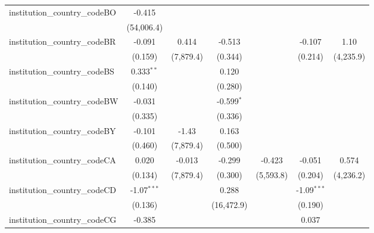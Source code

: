 \begin{tabular}{lcccccc}
   institution\_country\_codeBO          & -0.415         &               &                &               &                &   \\   
                                         & (54,006.4)     &               &                &               &                &   \\   
   institution\_country\_codeBR          & -0.091         & 0.414         & -0.513         &               & -0.107         & 1.10\\   
                                         & (0.159)        & (7,879.4)     & (0.344)        &               & (0.214)        & (4,235.9)\\   
   institution\_country\_codeBS          & 0.333$^{**}$   &               & 0.120          &               &                &   \\   
                                         & (0.140)        &               & (0.280)        &               &                &   \\   
   institution\_country\_codeBW          & -0.031         &               & -0.599$^{*}$   &               &                &   \\   
                                         & (0.335)        &               & (0.336)        &               &                &   \\   
   institution\_country\_codeBY          & -0.101         & -1.43         & 0.163          &               &                &   \\   
                                         & (0.460)        & (7,879.4)     & (0.500)        &               &                &   \\   
   institution\_country\_codeCA          & 0.020          & -0.013        & -0.299         & -0.423        & -0.051         & 0.574\\   
                                         & (0.134)        & (7,879.4)     & (0.300)        & (5,593.8)     & (0.204)        & (4,236.2)\\   
   institution\_country\_codeCD          & -1.07$^{***}$  &               & 0.288          &               & -1.09$^{***}$  &   \\   
                                         & (0.136)        &               & (16,472.9)     &               & (0.190)        &   \\   
   institution\_country\_codeCG          & -0.385         &               &                &               & 0.037          &   \\   

\end{tabular}

